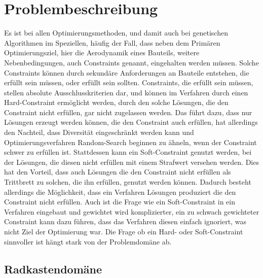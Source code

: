 \documentclass[12pt]{article}
\begin{document}
\section{Problembeschreibung}

Es ist bei allen Optimierungsmethoden, und damit auch bei genetischen Algorithmen im Speziellen, häufig der Fall, dass neben dem Primären Optimierungsziel, hier die Aerodynamik eines Bauteils, weitere Nebenbedingungen, auch Constraints genannt, eingehalten werden müssen.
Solche Constraints können durch sekundäre Anforderungen an Bauteile entstehen, die erfüllt sein müssen, oder erfüllt sein sollten.
Constraints, die erfüllt sein müssen, stellen absolute Ausschlusskriterien dar, und können im Verfahren durch einen Hard-Constraint ermöglicht werden, durch den solche Lösungen, die den Constraint nicht erfüllen, gar nicht zugelassen werden.
Das führt dazu, dass nur Lösungen erzeugt werden können, die den Constraint auch erfüllen, hat allerdings den Nachteil, dass Diversität eingeschränkt werden kann und Optimierungsverfahren Random-Search beginnen zu ähneln, wenn der Constraint schwer zu erfüllen ist.
Stattdessen kann ein Soft-Constraint genutzt werden, bei der Lösungen, die diesen nicht erfüllen mit einem Strafwert versehen werden.
Dies hat den Vorteil, dass auch Lösungen die den Constraint nicht erfüllen als Trittbrett zu solchen, die ihn erfüllen, genutzt werden können.
Dadurch besteht allerdings die Möglichkeit, dass ein Verfahren Lösungen produziert die den Constraint nicht erfüllen.
Auch ist die Frage wie ein Soft-Constraint in ein Verfahren eingebaut und gewichtet wird komplizierter, ein zu schwach gewichteter Constraint kann dazu führen, dass das Verfahren diesen einfach ignoriert, was nicht Ziel der Optimierung war.
Die Frage ob ein Hard- oder Soft-Constraint sinnvoller ist hängt stark von der Problemdomäne ab.

\subsection{Radkastendomäne}
\end{document}
